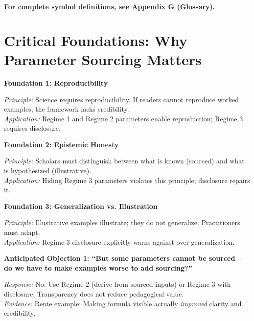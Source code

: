 \begin{table}[htbp]
\textbf{For complete symbol definitions, see Appendix G (Glossary).}


\section{Critical Foundations: Why Parameter Sourcing Matters}
\label{sec:jjj-foundations}

\textbf{Foundation 1: Reproducibility}
\begin{itemize}[nosep]
\textit{Principle:} Science requires reproducibility. If readers cannot reproduce worked examples, the framework lacks credibility.
\\ \textit{Application:} Regime 1 and Regime 2 parameters enable reproduction; Regime 3 requires disclosure.
\end{itemize}

\textbf{Foundation 2: Epistemic Honesty}
\begin{itemize}[nosep]
\textit{Principle:} Scholars must distinguish between what is known (sourced) and what is hypothesized (illustrative).
\\ \textit{Application:} Hiding Regime 3 parameters violates this principle; disclosure repairs it.
\end{itemize}

\textbf{Foundation 3: Generalization vs. Illustration}
\begin{itemize}[nosep]
\textit{Principle:} Illustrative examples illustrate; they do not generalize. Practitioners must adapt.
\\ \textit{Application:} Regime 3 disclosure explicitly warns against over-generalization.
\end{itemize}

\textbf{Anticipated Objection 1: ``But some parameters cannot be sourced---do we have to make examples worse to add sourcing?''}
\begin{itemize}[nosep]
\textit{Response:} No. Use Regime 2 (derive from sourced inputs) or Regime 3 with disclosure. Transparency does not reduce pedagogical value.
\\ \textit{Evidence:} Rente example: Making formula visible actually \textit{improved} clarity and credibility.
\end{itemize}


\end{table}
